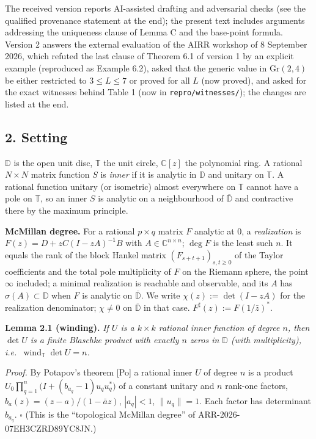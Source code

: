 \documentclass[
  11pt,
  a4paper,
]{article}
\begin{document}
The received version reports AI-assisted drafting and adversarial checks
(see the qualified provenance statement at the end); the present text
includes arguments addressing the uniqueness clause of Lemma C and the
base-point formula. Version 2 answers the external evaluation of the
AIRR workshop of 8 September 2026, which refuted the last clause of
Theorem 6.1 of version 1 by an explicit example (reproduced as Example
6.2), asked that the generic value in \(\mathrm{Gr}(2,\allowbreak{}4)\) be either
restricted to \(3\le L\le7\) or proved for all \(L\) (now proved), and
asked for the exact witnesses behind Table 1 (now in
{\small\texttt{repro/\allowbreak{}witnesses/\allowbreak{}}}); the changes are listed at the end.

\subsection{2. Setting}\label{setting}

\(\mathbb D\) is the open unit disc, \(\mathbb T\) the unit circle,
\(\mathbb C[z]\) the polynomial ring. A rational \(N\times N\) matrix
function \(S\) is \emph{inner} if it is analytic in \(\mathbb D\) and
unitary on \(\mathbb T\). A rational function unitary (or isometric)
almost everywhere on \(\mathbb T\) cannot have a pole on \(\mathbb T\),
so an inner \(S\) is analytic on a neighbourhood of
\(\overline{\mathbb D}\) and contractive there by the maximum principle.

\textbf{McMillan degree.} For a rational \(p\times q\) matrix \(F\)
analytic at \(0\), a \emph{realization} is \(F(z)=D+zC(I-zA)^{-1}B\)
with \(A\in\mathbb C^{n\times n}\); \(\deg F\) is the least such \(n\).
It equals the rank of the block Hankel matrix \((F_{s+t+1})_{s,\allowbreak{}t\ge0}\)
of the Taylor coefficients and the total pole multiplicity of \(F\) on
the Riemann sphere, the point \(\infty\) included; a minimal realization
is reachable and observable, and its \(A\) has
\(\sigma(A)\subset\mathbb D\) when \(F\) is analytic on
\(\overline{\mathbb D}\). We write \(\chi(z):=\det(I-zA)\) for the
realization denominator; \(\chi\ne0\) on \(\overline{\mathbb D}\) in
that case. \(F^\sharp(z):=F(1/\bar z)^*\).

\textbf{Lemma 2.1 (winding).} \emph{If \(U\) is a \(k\times k\) rational
inner function of degree \(n\), then \(\det U\) is a finite Blaschke
product with exactly \(n\) zeros in \(\mathbb D\) (with multiplicity),
i.e.~\(\operatorname{wind}_{\mathbb T}\det U=n\).}

\emph{Proof.} By Potapov's theorem {[}Po{]} a rational inner \(U\) of
degree \(n\) is a product
\(U_0\prod_{q=1}^n\bigl(I+(b_{a_q}-1)u_qu_q^*\bigr)\) of a constant
unitary and \(n\) rank-one factors, \(b_a(z)=(z-a)/(1-\bar az)\),
\(|a_q|<1\), \(\|u_q\|=1\). Each factor has determinant \(b_{a_q}\).
\(\square\) (This is the ``topological McMillan degree'' of
ARR-2026-07EH3CZRD89YC8JN.)
\end{document}
